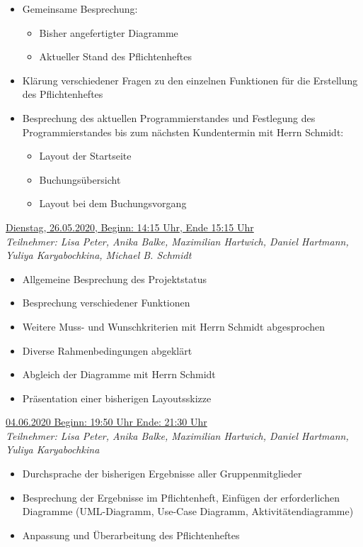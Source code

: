 \documentclass[a4paper,report,headsepline]{scrreprt}
\begin{document}
\begin{itemize}
\item Gemeinsame Besprechung:

\begin{itemize}
\item Bisher angefertigter Diagramme
\item Aktueller Stand des Pflichtenheftes
\end{itemize}

\item Klärung verschiedener Fragen zu den einzelnen Funktionen für die Erstellung des Pflichtenheftes
\item Besprechung des aktuellen Programmierstandes und Festlegung des Programmierstandes bis zum nächsten Kundentermin mit Herrn Schmidt:
\begin{itemize}
\item Layout der Startseite
\item Buchungsübersicht
\item Layout bei dem Buchungsvorgang

\end{itemize}
\end{itemize} 
 \underline{{\large Dienstag, 26.05.2020, Beginn: 14:15 Uhr, Ende 15:15 Uhr}}  \\
\textit{Teilnehmer: Lisa Peter, Anika Balke, Maximilian Hartwich, Daniel Hartmann, Yuliya Karyabochkina, Michael B. Schmidt}

\begin{itemize}
\item Allgemeine Besprechung des Projektstatus
\item Besprechung verschiedener Funktionen
\item Weitere Muss- und Wunschkriterien mit Herrn Schmidt abgesprochen
\item Diverse Rahmenbedingungen abgeklärt
\item Abgleich der Diagramme mit Herrn Schmidt
\item Präsentation einer bisherigen Layoutsskizze 

\end{itemize}
 \underline{{\large 04.06.2020 Beginn: 19:50 Uhr Ende: 21:30 Uhr}}  \\
\textit{Teilnehmer: Lisa Peter, Anika Balke, Maximilian Hartwich, Daniel Hartmann, Yuliya Karyabochkina}

\begin{itemize}
\item Durchsprache der bisherigen Ergebnisse aller Gruppenmitglieder
\item Besprechung der Ergebnisse im Pflichtenheft, Einfügen der erforderlichen Diagramme (UML-Diagramm, Use-Case Diagramm, Aktivitätendiagramme)
\item Anpassung und Überarbeitung des Pflichtenheftes

\end{itemize}
\end{document}
